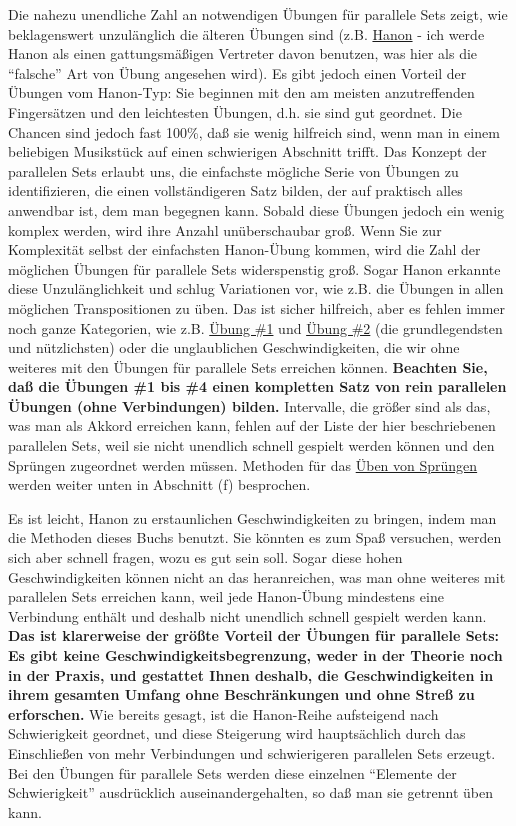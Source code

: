 Die nahezu unendliche Zahl an notwendigen Übungen für parallele Sets zeigt, wie beklagenswert unzulänglich die älteren Übungen sind (z.B. \hyperref[c1iii7h]{Hanon} - ich werde Hanon als einen gattungsmäßigen Vertreter davon benutzen, was hier als die \enquote{falsche} Art von Übung angesehen wird).
Es gibt jedoch einen Vorteil der Übungen vom Hanon-Typ: Sie beginnen mit den am meisten anzutreffenden Fingersätzen und den leichtesten Übungen, d.h. sie sind gut geordnet.
Die Chancen sind jedoch fast 100\%, daß sie wenig hilfreich sind, wenn man in einem beliebigen Musikstück auf einen schwierigen Abschnitt trifft.
Das Konzept der parallelen Sets erlaubt uns, die einfachste mögliche Serie von Übungen zu identifizieren, die einen vollständigeren Satz bilden, der auf praktisch alles anwendbar ist, dem man begegnen kann.
Sobald diese Übungen jedoch ein wenig komplex werden, wird ihre Anzahl unüberschaubar groß.
Wenn Sie zur Komplexität selbst der einfachsten Hanon-Übung kommen, wird die Zahl der möglichen Übungen für parallele Sets widerspenstig groß.
Sogar Hanon erkannte diese Unzulänglichkeit und schlug Variationen vor, wie z.B. die Übungen in allen möglichen Transpositionen zu üben.
Das ist sicher hilfreich, aber es fehlen immer noch ganze Kategorien, wie z.B. \hyperref[c1iii7b1]{Übung \#1} und \hyperref[c1iii7b2]{Übung \#2} (die grundlegendsten und nützlichsten) oder die unglaublichen Geschwindigkeiten, die wir ohne weiteres mit den Übungen für parallele Sets erreichen können.
\textbf{Beachten Sie, daß die Übungen \#1 bis \#4 einen kompletten Satz von rein parallelen Übungen (ohne Verbindungen) bilden.}
Intervalle, die größer sind als das, was man als Akkord erreichen kann, fehlen auf der Liste der hier beschriebenen parallelen Sets, weil sie nicht unendlich schnell gespielt werden können und den Sprüngen zugeordnet werden müssen.
Methoden für das \hyperref[c1iii7f]{Üben von Sprüngen} werden weiter unten in Abschnitt (f) besprochen.

Es ist leicht, Hanon zu erstaunlichen Geschwindigkeiten zu bringen, indem man die Methoden dieses Buchs benutzt.
Sie könnten es zum Spaß versuchen, werden sich aber schnell fragen, wozu es gut sein soll.
Sogar diese hohen Geschwindigkeiten können nicht an das heranreichen, was man ohne weiteres mit parallelen Sets erreichen kann, weil jede Hanon-Übung mindestens eine Verbindung enthält und deshalb nicht unendlich schnell gespielt werden kann.
\textbf{Das ist klarerweise der größte Vorteil der Übungen für parallele Sets: Es gibt keine Geschwindigkeitsbegrenzung, weder in der Theorie noch in der Praxis, und gestattet Ihnen deshalb, die Geschwindigkeiten in ihrem gesamten Umfang ohne Beschränkungen und ohne Streß zu erforschen.}
Wie bereits gesagt, ist die Hanon-Reihe aufsteigend nach Schwierigkeit geordnet, und diese Steigerung wird hauptsächlich durch das Einschließen von mehr Verbindungen und schwierigeren parallelen Sets erzeugt.
Bei den Übungen für parallele Sets werden diese einzelnen \enquote{Elemente der Schwierigkeit} ausdrücklich auseinandergehalten, so daß man sie getrennt üben kann.

